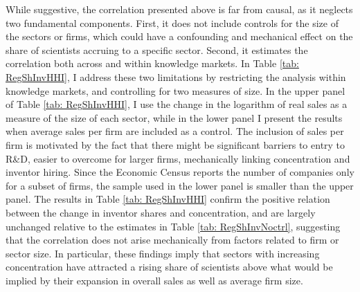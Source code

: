 While suggestive, the correlation presented above is far from causal,
as it neglects two fundamental components. First, it does not include
controls for the size of the sectors or firms, which could have a
confounding and mechanical effect on the share of scientists accruing
to a specific sector. Second, it estimates the correlation both across
and within knowledge markets. In Table \ref{tab: RegShInvHHI}, I
address these two limitations by restricting the analysis within knowledge
markets, and controlling for two measures of size. In the upper panel
of Table \ref{tab: RegShInvHHI}, I use the change in the logarithm
of real sales as a measure of the size of each sector, while in the
lower panel I present the results when average sales per firm are
included as a control. The inclusion of sales per firm is motivated
by the fact that there might be significant barriers to entry to R\&D,
easier to overcome for larger firms, mechanically linking concentration
and inventor hiring. Since the Economic Census reports the number
of companies only for a subset of firms, the sample used in the lower
panel is smaller than the upper panel. The results in Table \ref{tab: RegShInvHHI}
confirm the positive relation between the change in inventor shares
and concentration, and are largely unchanged relative to the estimates
in Table \ref{tab: RegShInvNoctrl}, suggesting that the correlation
does not arise mechanically from factors related to firm or sector
size. In particular, these findings imply that sectors with increasing
concentration have attracted a rising share of scientists above what
would be implied by their expansion in overall sales as well as average
firm size. 

